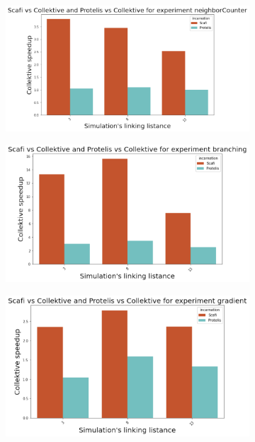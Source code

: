 \begin{figure}[ht!]
    \centering
    \begin{subfigure}[b]{0.49\textwidth}
        \centering
        \includegraphics[width=\textwidth]{figures/neighbor-speedup}
    \end{subfigure}
    \begin{subfigure}[b]{0.49\textwidth}
        \centering
        \includegraphics[width=\textwidth]{figures/branching-speedup}
    \end{subfigure}
    \begin{subfigure}[b]{0.49\textwidth}
        \centering
        \includegraphics[width=\textwidth]{figures/gradient-speedup}

\end{subfigure}
\end{figure}
